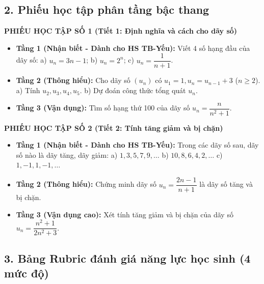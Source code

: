 \documentclass[12pt, a4paper]{article}
\begin{document}
\subsection*{2. Phiếu học tập phân tầng bậc thang}  
  
\noindent \textbf{PHIẾU HỌC TẬP SỐ 1 (Tiết 1: Định nghĩa và cách cho dãy số)}  
\begin{itemize}[leftmargin=0.6cm]  
    \item \textbf{Tầng 1 (Nhận biết - Dành cho HS TB-Yếu):}  
    Viết 4 số hạng đầu của dãy số: a) $u_n = 3n - 1$; \quad b) $u_n = 2^n$; \quad c) $u_n = \dfrac{1}{n + 1}$.  
    \item \textbf{Tầng 2 (Thông hiểu):}  
    Cho dãy số $(u_n)$ có $u_1 = 1, u_n = u_{n-1} + 3$ ($n \ge 2$).  
    a) Tính $u_2, u_3, u_4, u_5$. \quad b) Dự đoán công thức tổng quát $u_n$.  
    \item \textbf{Tầng 3 (Vận dụng):}  
    Tìm số hạng thứ 100 của dãy số $u_n = \dfrac{n}{n^2 + 1}$.  
\end{itemize}  
  
\vspace{5pt}  
\noindent \textbf{PHIẾU HỌC TẬP SỐ 2 (Tiết 2: Tính tăng giảm và bị chặn)}  
\begin{itemize}[leftmargin=0.6cm]  
    \item \textbf{Tầng 1 (Nhận biết - Dành cho HS TB-Yếu):}  
    Trong các dãy số sau, dãy số nào là dãy tăng, dãy giảm:  
    a) $1, 3, 5, 7, 9,\dots$ \qquad b) $10, 8, 6, 4, 2,\dots$ \qquad c) $1, -1, 1, -1,\dots$  
    \item \textbf{Tầng 2 (Thông hiểu):}  
    Chứng minh dãy số $u_n = \dfrac{2n - 1}{n + 1}$ là dãy số tăng và bị chặn.  
    \item \textbf{Tầng 3 (Vận dụng cao):}  
    Xét tính tăng giảm và bị chặn của dãy số $u_n = \dfrac{n^2 + 1}{2n^2 + 3}$.  
\end{itemize}  
  
\subsection*{3. Bảng Rubric đánh giá năng lực học sinh (4 mức độ)}  
  
\end{document}
